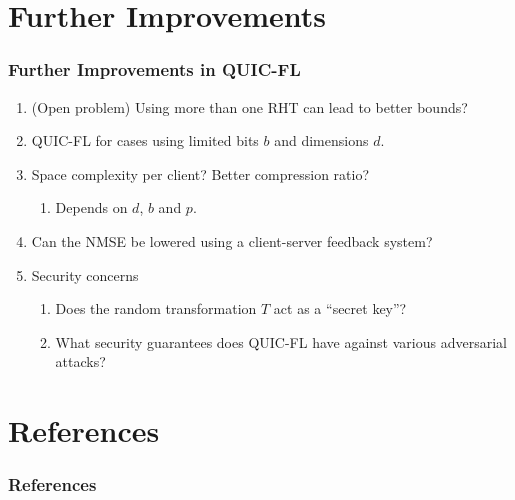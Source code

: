 \documentclass{beamer}
\begin{document}
    \section{Further Improvements}
    \begin{frame}
        \frametitle{Further Improvements in QUIC-FL}    
        \begin{enumerate}
            \item (Open problem) Using more than one RHT can lead to better
            bounds?
            \item QUIC-FL for cases using limited bits \(b\) and dimensions
            \(d\).
            \item Space complexity per client? Better compression ratio?
            \begin{enumerate}
                \item Depends on \(d\), \(b\) and \(p\).
            \end{enumerate}
            \item Can the NMSE be lowered using a client-server feedback system?
            \item Security concerns
            \begin{enumerate}
                \item Does the random transformation \(T\) act as a ``secret
                key''?
                \item What security guarantees does QUIC-FL have against various
                adversarial attacks?
            \end{enumerate}
        \end{enumerate}
    \end{frame}

    \section{References}
    \begin{frame}
        \frametitle{References}
        
    \end{frame}
\end{document}
